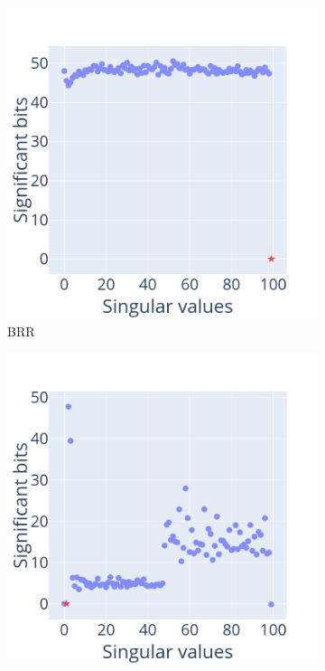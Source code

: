 \documentclass[10pt,journal,compsoc]{IEEEtran}
\begin{document}
\begin{figure}
    \centering
    \begin{subfigure}{0.49\linewidth}
        \includegraphics[width=\linewidth]{figure/BRR_singular_values.png}
        \caption{BRR}
        \label{fig:BRR_svd}
    \end{subfigure}
    \begin{subfigure}{0.49\linewidth}
        \includegraphics[width=\linewidth]{figure/OLS_singular_values.png}

\end{subfigure}
\end{figure}
\end{document}
